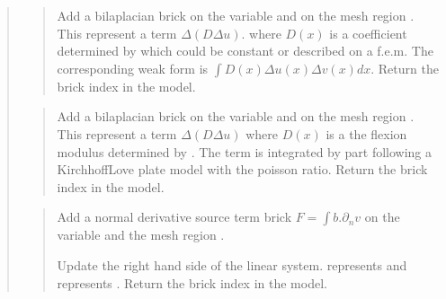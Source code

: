 \documentclass[a4paper,11pt,english]{sphinxmanual}
\begin{document}
\begin{quote}
\sphinxAtStartPar
{}
\begin{quote}

\sphinxAtStartPar
Add a bilaplacian brick on the variable
 and on the mesh region .
This represent a term \(\Delta(D \Delta u)\).
where \(D(x)\) is a coefficient determined by  which
could be constant or described on a f.e.m. The corresponding weak form
is \(\int D(x)\Delta u(x) \Delta v(x) dx\).
Return the brick index in the model.
\end{quote}

\sphinxAtStartPar
{}
\begin{quote}

\sphinxAtStartPar
Add a bilaplacian brick on the variable
 and on the mesh region .
This represent a term \(\Delta(D \Delta u)\) where \(D(x)\)
is a the flexion modulus determined by . The term is
integrated by part following a Kirchhoff\sphinxhyphen{}Love plate model
with  the poisson ratio.
Return the brick index in the model.
\end{quote}

\sphinxAtStartPar
{}
\begin{quote}

\sphinxAtStartPar
Add a normal derivative source term brick
\(F = \int b.\partial_n v\) on the variable  and the
mesh region .

\sphinxAtStartPar
Update the right hand side of the linear system.
 represents  and  represents .
Return the brick index in the model.
\end{quote}

\sphinxAtStartPar
{}
\begin{quote}


\end{quote}
\end{quote}
\end{document}
